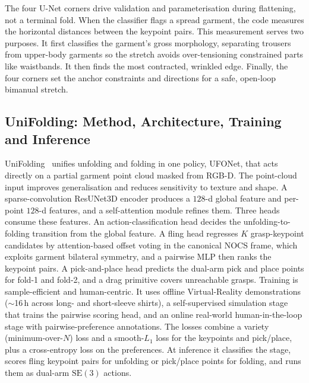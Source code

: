 \documentclass[journal]{IEEEtran}
\begin{document}
The four U-Net corners drive validation and parameterisation during flattening, not a terminal fold. When the classifier flags a spread garment, the code measures the horizontal distances between the keypoint pairs. This measurement serves two purposes. It first classifies the garment's gross morphology, separating trousers from upper-body garments so the stretch avoids over-tensioning constrained parts like waistbands. It then finds the most contracted, wrinkled edge. Finally, the four corners set the anchor constraints and directions for a safe, open-loop bimanual stretch.

\subsection{UniFolding: Method, Architecture, Training and Inference}
UniFolding~\cite{xue2023unifolding} unifies unfolding and folding in one policy, UFONet, that acts directly on a partial garment point cloud masked from RGB-D. The point-cloud input improves generalisation and reduces sensitivity to texture and shape. A sparse-convolution ResUNet3D encoder produces a $128$-d global feature and per-point $128$-d features, and a self-attention module refines them. Three heads consume these features. An action-classification head decides the unfolding-to-folding transition from the global feature. A fling head regresses $K$ grasp-keypoint candidates by attention-based offset voting in the canonical NOCS frame, which exploits garment bilateral symmetry, and a pairwise MLP then ranks the keypoint pairs. A pick-and-place head predicts the dual-arm pick and place points for fold-1 and fold-2, and a drag primitive covers unreachable grasps. Training is sample-efficient and human-centric. It uses offline Virtual-Reality demonstrations ($\sim$16\,h across long- and short-sleeve shirts), a self-supervised simulation stage that trains the pairwise scoring head, and an online real-world human-in-the-loop stage with pairwise-preference annotations. The losses combine a variety (minimum-over-$N$) loss and a smooth-$L_1$ loss for the keypoints and pick/place, plus a cross-entropy loss on the preferences. At inference it classifies the stage, scores fling keypoint pairs for unfolding or pick/place points for folding, and runs them as dual-arm $\mathrm{SE}(3)$ actions.
\end{document}
